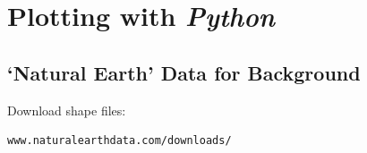 \documentclass[11pt,fleqn]{report}              %
\begin{document}


\section{Plotting with {\it Python}}               
\label{sec:post_python}

\subsection{`Natural Earth' Data for Background}

Download shape files:
\lstset{language=bash}   
\begin{lstlisting}[frame=trBL]
www.naturalearthdata.com/downloads/
\end{lstlisting}
\end{document}
